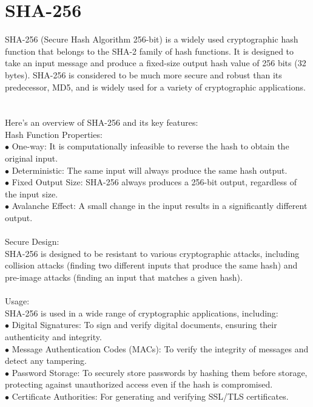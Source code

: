 \documentclass{report}
\begin{document}
 \section{SHA-256}
 
 SHA-256 (Secure Hash Algorithm 256-bit) is a widely used cryptographic hash function that belongs to the SHA-2 family of hash functions. It is designed to take an input message and produce a fixed-size output hash value of 256 bits (32 bytes). SHA-256 is considered to be much more secure and robust than its predecessor, MD5, and is widely used for a variety of cryptographic applications.\\
 \\
 \\
 Here's an overview of SHA-256 and its key features:\\
Hash Function Properties:\\
$\bullet$ One-way: It is computationally infeasible to reverse the hash to obtain the original input.\\
$\bullet$ Deterministic: The same input will always produce the same hash output.\\
$\bullet$ Fixed Output Size: SHA-256 always produces a 256-bit output, regardless of the input size.\\
$\bullet$ Avalanche Effect: A small change in the input results in a significantly different output.\\
 \\
Secure Design:\\
 SHA-256 is designed to be resistant to various cryptographic attacks, including collision attacks (finding two different inputs that produce the same hash) and pre-image attacks (finding an input that matches a given hash).\\
 \\
 Usage:\\
 SHA-256 is used in a wide range of cryptographic applications, including:\\
$\bullet$ Digital Signatures: To sign and verify digital documents, ensuring their authenticity and integrity.\\
$\bullet$ Message Authentication Codes (MACs): To verify the integrity of messages and detect any tampering.\\
$\bullet$ Password Storage: To securely store passwords by hashing them before storage, protecting against unauthorized access even if the hash is compromised.\\
$\bullet$ Certificate Authorities: For generating and verifying SSL/TLS certificates.\\
\end{document}
